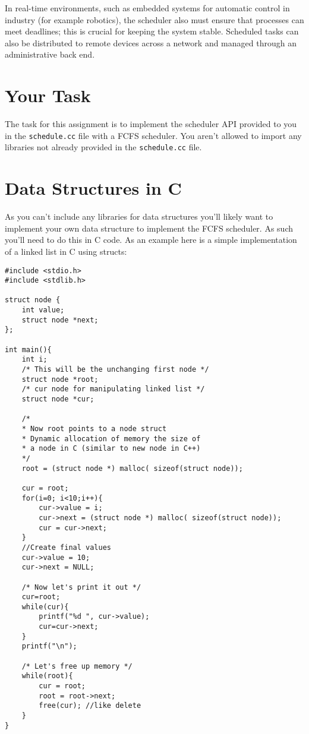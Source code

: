 \documentclass[11pt]{article}
\begin{document}
In real-time environments, such as embedded systems for automatic control in industry (for example robotics), the scheduler also must ensure that processes can meet deadlines; this is crucial for keeping the system stable. Scheduled tasks can also be distributed to remote devices across a network and managed through an administrative back end.

\section*{Your Task}

The task for this assignment is to implement the scheduler API provided to you in the {\tt schedule.cc} file with a FCFS scheduler. You aren't allowed to import any libraries not already provided in the {\tt schedule.cc} file.

\section*{Data Structures in C}
As you can't include any libraries for data structures you'll likely want to implement your own data structure to implement the FCFS scheduler. As such you'll need to do this in C code. As an example here is a simple implementation of a linked list in C using structs:

\begin{verbatim}
#include <stdio.h>
#include <stdlib.h>

struct node {
    int value;
    struct node *next;
};

int main(){
    int i;
    /* This will be the unchanging first node */
    struct node *root;
    /* cur node for manipulating linked list */
    struct node *cur;      

    /* 
    * Now root points to a node struct 
    * Dynamic allocation of memory the size of 
    * a node in C (similar to new node in C++)
    */
    root = (struct node *) malloc( sizeof(struct node));

    cur = root;
    for(i=0; i<10;i++){
        cur->value = i;
        cur->next = (struct node *) malloc( sizeof(struct node));
        cur = cur->next;
    }
    //Create final values
    cur->value = 10;
    cur->next = NULL;

    /* Now let's print it out */
    cur=root;
    while(cur){
        printf("%d ", cur->value);
        cur=cur->next;
    }
    printf("\n");

    /* Let's free up memory */
    while(root){
        cur = root;
        root = root->next;
        free(cur); //like delete
    }          
}
\end{verbatim}
\end{document}

